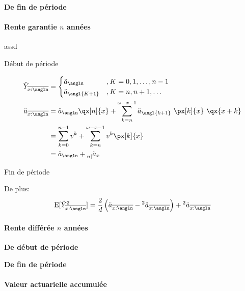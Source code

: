 \documentclass[10pt, french]{article}
\begin{document}
\begin{multicols*}{3}
\textbf{De fin de période}

\paragraph{Rente garantie $n$ années}
assd

\begin{minipage}[t]{0.5\columnwidth}
\begin{center}
Début de période
\end{center}
\begin{align*}
\ddot{Y}_{\overline{x:\angln}} 
	&= 	\begin{cases}
			\ddot{a}_{\angln}			& , K = 0, 1, \dots, n - 1 \\
			\ddot{a}_{\angl{K + 1}}		& , K = n, n + 1, \dots \\
		\end{cases} \\
	\ddot{a}_{\overline{x:\angln}}	
	&=	\ddot{a}_{\angln} \qx[n]{x} + \sum_{k = n}^{\omega - x - 1} \ddot{a}_{\angl{k + 1}} \ \px[k]{x} \ \qx{x + k}	\\
	&=	\sum_{k = 0}^{n - 1} v^{k} + \sum_{k = n}^{\omega - x - 1} v^{k} \px[k]{x}	\\
	&=	\ddot{a}_{\angln} + \prescript{}{n|}{\ddot{a}_{x}}
\end{align*}
\end{minipage}
\begin{minipage}[t]{0.5\columnwidth}
\begin{center}
Fin de période
\end{center}
\end{minipage}

De plus:
\begin{equation}
	\text{E}[\ddot{Y}_{\overline{x:\angln}}^{2}]	
	=	\frac{2}{d} \left(\ddot{a}_{\overline{x:\angln}} - \prescript{2}{}{\ddot{a}_{\overline{x:\angln}}}\right) + \prescript{2}{}{\ddot{a}_{\overline{x:\angln}}}
\end{equation}

\paragraph{Rente différée $n$ années}

\textbf{De début de période}

\textbf{De fin de période}

\paragraph{Valeur actuarielle accumulée}


\end{multicols*}
\end{document}
